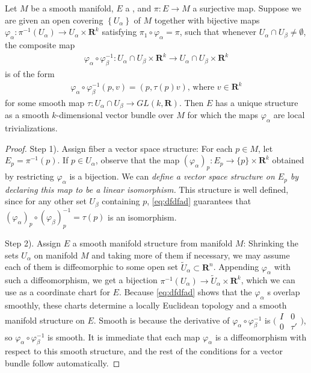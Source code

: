 \documentclass[12pt]{article} %
\begin{document}
\begin{lema}\label{eq:ddsafa}
Let $M$ be a smooth manifold, $E$ a , and $\pi: E \rightarrow M$ a surjective map. Suppose we are given an open covering $\left\{U_{\alpha}\right\}$ of $M$ together with bijective maps $\varphi_{\alpha}: \pi^{-1}\left(U_{\alpha}\right) \rightarrow U_{\alpha} \times \mathbf{R}^{k}$ satisfying $\pi_{1} \circ \varphi_{\alpha}=\pi$, such that whenever $U_{\alpha} \cap U_{\beta} \neq \emptyset$, the composite map
\begin{align}
\varphi_{\alpha} \circ \varphi_{\beta}^{-1}: U_{\alpha} \cap U_{\beta} \times \mathbf{R}^{k} \rightarrow U_{\alpha} \cap U_{\beta} \times \mathbf{R}^{k}\label{eq:dfdfad}
\end{align}
is of the form
\begin{align*}
\varphi_{\alpha} \circ \varphi_{\beta}^{-1}(p, v)=(p, \tau(p) v) \text {, where } v \in \mathbf{R}^k
\end{align*}
for some smooth map $\tau: U_{\alpha} \cap U_{\beta} \rightarrow G L(k, \mathbf{R})$. Then $E$ has a unique structure as a smooth $k$-dimensional vector bundle over $M$ for which the maps $\varphi_{\alpha}$ are local trivializations.
\end{lema}
\begin{proof}
Step 1). Assign fiber a vector space structure: 
 For each $p \in M$, let $E_{p}=\pi^{-1}(p)$. If $p \in U_{\alpha}$, observe that the map $\left(\varphi_{\alpha}\right)_{p}: E_{p} \rightarrow\{p\} \times \mathbf{R}^{k}$ obtained by restricting $\varphi_{\alpha}$ is a bijection. We can \textit{define a vector space structure on $E_{p}$ by declaring this map to be a linear isomorphism.} This structure is well defined, since for any other set $U_{\beta}$ containing $p$, \cref{eq:dfdfad} guarantees that $\left(\varphi_{\alpha}\right)_{p} \circ\left(\varphi_{\beta}\right)_{p}^{-1}=\tau(p)$ is an isomorphism.

Step 2). Assign $E$ a smooth manifold structure from manifold $M$: 
Shrinking the sets $U_{\alpha}$ on manifold $M$ and taking more of them if necessary, we may assume each of them is diffeomorphic to some open set $\widetilde{U}_{\alpha} \subset \mathbf{R}^{n}$. Appending $\varphi_{\alpha}$ with such a diffeomorphism, we get a bijection $\pi^{-1}\left(U_{\alpha}\right) \rightarrow \widetilde{U}_{\alpha} \times \mathbf{R}^{k}$, which we can use as a coordinate chart for $E$. Because \cref{eq:dfdfad} shows that the $\varphi_{\alpha}$ s overlap smoothly, these charts determine a locally Euclidean topology and a smooth manifold structure on $E$.  Smooth is because the derivative of $\varphi_{\alpha} \circ \varphi_{\beta}^{-1}$ is $\big(\begin{smallmatrix}
  I & 0\\
  0 & \tau'
\end{smallmatrix}\big)$, so $\varphi_{\alpha} \circ \varphi_{\beta}^{-1}$ is smooth. It is immediate that each map $\varphi_{\alpha}$ is a diffeomorphism with respect to this smooth structure, and the rest of the conditions for a vector bundle follow automatically.
\end{proof} 
\end{document}
